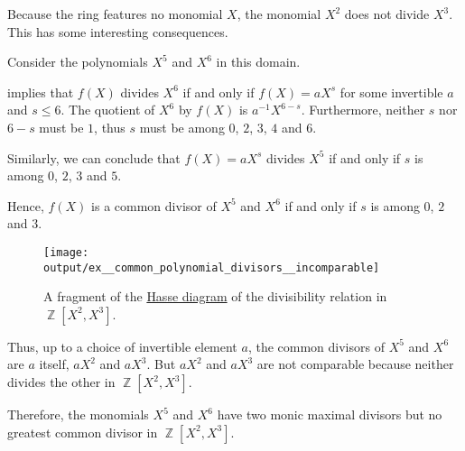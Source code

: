 \begin{example}
\begin{thmenum}
    Because the ring features no monomial \( X \), the monomial \( X^2 \) does not divide \( X^3 \). This has some interesting consequences.

    Consider the polynomials \( X^5 \) and \( X^6 \) in this domain.

     implies that \( f(X) \) divides \( X^6 \) if and only if \( f(X) = aX^s \) for some invertible \( a \) and \( s \leq 6 \). The quotient of \( X^6 \) by \( f(X) \) is \( a^{-1} X^{6-s} \). Furthermore, neither \( s \) nor \( 6 - s \) must be \( 1 \), thus \( s \) must be among \( 0 \), \( 2 \), \( 3 \), \( 4 \) and \( 6 \).

    Similarly, we can conclude that \( f(X) = aX^s \) divides \( X^5 \) if and only if \( s \) is among \( 0 \), \( 2 \), \( 3 \) and \( 5 \).

    Hence, \( f(X) \) is a common divisor of \( X^5 \) and \( X^6 \) if and only if \( s \) is among \( 0 \), \( 2 \) and \( 3 \).

    \begin{figure}[!ht]
      \centering
      \texttt{[image: output/ex\_\_common\_polynomial\_divisors\_\_incomparable]}
      \caption{A fragment of the \hyperref[def:hasse_diagram]{Hasse diagram} of the divisibility relation in \( \BbbZ[X^2, X^3] \).}
      \label{fig:ex:common_polynomial_divisors/incomparable}
    \end{figure}

    Thus, up to a choice of invertible element \( a \), the common divisors of \( X^5 \) and \( X^6 \) are \( a \) itself, \( aX^2 \) and \( aX^3 \). But \( aX^2 \) and \( aX^3 \) are not comparable because neither divides the other in \( \BbbZ[X^2, X^3] \).

    Therefore, the monomials \( X^5 \) and \( X^6 \) have two monic maximal divisors but no greatest common divisor in \( \BbbZ[X^2, X^3] \).
  \end{thmenum}
\end{example}

